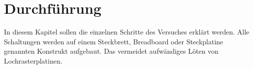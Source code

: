 \section{Durchführung}
\label{sec:Durchfuehrung}
In diesem Kapitel sollen die einzelnen Schritte des Versuches erklärt werden.
Alle Schaltungen werden auf einem Steckbrett, Breadboard oder Steckplatine genannten Konstrukt
aufgebaut. Das vermeidet aufwändiges Löten von Lochrasterplatinen.



